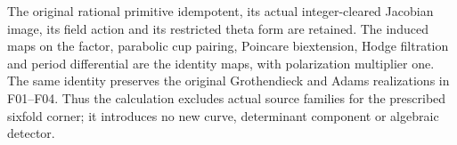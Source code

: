 The original rational primitive idempotent, its actual
integer-cleared Jacobian image, its field action and its
restricted theta form are retained. The induced maps on
the factor, parabolic cup pairing, Poincare biextension,
Hodge filtration and period differential are the identity
maps, with polarization multiplier one. The same identity
preserves the original Grothendieck and Adams realizations
in F01--F04. Thus the calculation excludes actual source
families for the prescribed sixfold corner; it introduces
no new curve, determinant component or algebraic detector.
